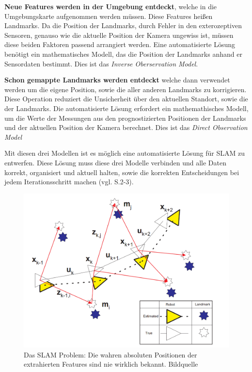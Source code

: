 \textbf{Neue Features werden in der Umgebung entdeckt}, welche in die Umgebungskarte aufgenommen werden müssen. Diese Features heißen \glqq Landmarks\grqq{}. Da die Position der Landmarks, durch Fehler in den exterozeptiven Sensoren, genauso wie die aktuelle Position der Kamera ungewiss ist, müssen diese beiden Faktoren passend arrangiert werden. Eine automatisierte Lösung benötigt ein mathematisches Modell, das die Position der Landmarks anhand er Sensordaten bestimmt. Dies ist das \glqq{}\textit{Inverse Oberservation Model}\grqq{}.

\textbf{Schon gemappte Landmarks werden entdeckt} welche dann verwendet werden um die eigene Position, sowie die aller anderen Landmarks zu korrigieren. Diese Operation reduziert die Unsicherheit über den aktuellen Standort, sowie die der Landmarks. Die automatisierte Lösung erfordert ein mathemathisches Modell, um die Werte der Messungen aus den prognostizierten Positionen der Landmarks und der aktuellen Position der Kamera berechnet. Dies ist das \glqq \textit{Direct Observation Model}\grqq

Mit diesen drei Modellen ist es möglich eine automatisierte Lösung für SLAM zu entwerfen. Diese Lösung muss diese drei Modelle verbinden und alle Daten korrekt, organisiert und aktuell halten, sowie die korrekten Entscheidungen bei jedem Iterationsschritt machen (vgl. \cite{ekf_slam} S.2-3).

\begin{figure}[H]
	\centering
	\includegraphics[scale=0.55]{slam_problem.png}
	\caption{Das SLAM Problem: Die wahren absoluten Positionen der extrahierten Features sind nie wirklich bekannt. Bildquelle \cite{slam}}
\end{figure} 

